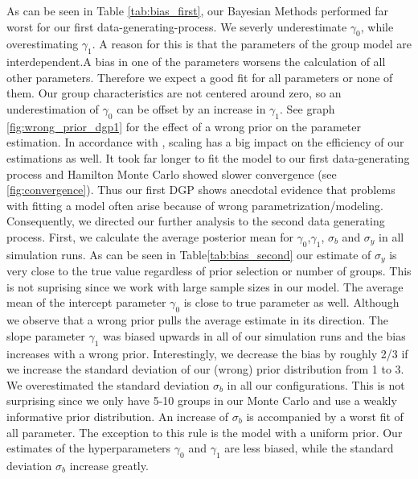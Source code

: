 As can be seen in Table  \ref{tab:bias_first}, our Bayesian Methods performed far worst for our first data-generating-process. We severly underestimate $\gamma_0$, while overestimating $\gamma_1$.
A reason for this is that the parameters of the group model are interdependent.A bias in one of the parameters worsens the calculation of all other parameters.  Therefore we expect a good fit for all parameters or none of them. Our group characteristics are not centered around zero, so an underestimation of $\gamma_0$  can be offset by an increase in $\gamma_1$. See graph \ref{fig:wrong_prior_dgp1} for the effect of a wrong prior on the parameter estimation.
In accordance with \cite{gelman2008weakly}, scaling has a big impact on the efficiency of our estimations as well. 
It took far longer to fit the model to our first data-generating process  and Hamilton Monte Carlo showed slower convergence (see \ref{fig:convergence}). Thus our first DGP shows anecdotal evidence that problems with fitting a model often arise because of wrong parametrization/modeling.
\\
Consequently, we directed our further analysis to the second data generating process.
First, we calculate the average posterior mean for $\gamma_0$,$\gamma_1$, $\sigma_b $ and $\sigma_y$ in all simulation runs.
As can be seen in Table\ref{tab:bias_second} our estimate of $\sigma_y$ is very close to the true value regardless of prior selection or number of groups. This is not suprising since we work with large sample sizes in our model. 
The average mean of the intercept parameter $\gamma_0$ is close to true parameter as well. Although we observe that a wrong prior pulls the average estimate in its direction.
The slope parameter $\gamma_1$ was biased upwards in all of our simulation runs and the bias increases with a wrong prior. Interestingly, we decrease the bias by roughly 2/3 if we increase the standard deviation of our (wrong) prior distribution from 1 to 3. \\
We overestimated the standard deviation $\sigma_b$ in all our configurations. This is not surprising since we only have 5-10 groups in our Monte Carlo and use a weakly informative prior distribution. An increase of $\sigma_b$ is accompanied by a worst fit of all parameter. The exception to this rule is the model with a uniform prior. Our estimates of the hyperparameters $\gamma_0$ and $\gamma_1$ are less biased, while the standard deviation $\sigma_b$ increase greatly.\\
 
